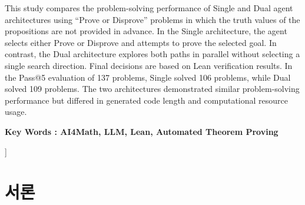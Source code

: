 \documentclass[a4paper,9pt,twocolumn]{extarticle}
\begin{document}
\begin{@twocolumnfalse}
\vspace{5pt}
\par{}\par
This study compares the problem-solving performance of Single and Dual agent architectures using “Prove or Disprove” problems in which the truth values of the propositions are not provided in advance. In the Single architecture, the agent selects either Prove or Disprove and attempts to prove the selected goal. In contrast, the Dual architecture explores both paths in parallel without selecting a single search direction. Final decisions are based on Lean verification results. In the Pass@5 evaluation of 137 problems, Single solved 106 problems, while Dual solved 109 problems. The two architectures demonstrated similar problem-solving performance but differed in generated code length and computational resource usage.
\par\noindent\textbf{Key Words : AI4Math, LLM, Lean, Automated Theorem Proving}
\par\endgroup
\vspace{8pt}
\end{@twocolumnfalse}]
\begingroup\renewcommand{\thefootnote}{}\endgroup
\section{서론}
\end{document}
